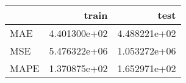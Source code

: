\begin{tabular}{lrr}
\toprule
{} &         train &          test \\
\midrule
MAE  &  4.401300e+02 &  4.488221e+02 \\
MSE  &  5.476322e+06 &  1.053272e+06 \\
MAPE &  1.370875e+02 &  1.652971e+02 \\
\bottomrule
\end{tabular}

